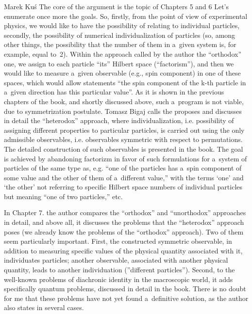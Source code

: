 \begin{newrevengenv}{Marek Kuś}
The core of the argument is the topic of Chapters 5 and 6 Let's enumerate once more the goals. So, firstly, from the point of view of experimental physics, we would like to have the possibility of relating to individual particles, secondly, the possibility of numerical individualization of particles (so, among other things, the possibility that the number of them in a~given system is, for example, equal to~2). Within the approach called by the author the ``orthodox'' one, we assign to each particle ``its'' Hilbert space (``factorism''), and then we would like to measure a~given observable (e.g., spin component) in one of these spaces, which would allow statements ``the spin component of the k-th particle in a~given direction has this particular value''. As it is shown in the previous chapters of the book, and shortly discussed above, such a~program is not viable, due to symmetrization postulate. Tomasz Bigaj calls the proposes and discusses in detail the ``heterodox'' approach, where individualization, i.e. possibility of assigning different properties to particular particles, is carried out using the only admissible observables, i.e. observables symmetric with respect to permutations. The detailed construction of such observables is presented in the book. The goal is achieved by abandoning factorizm in favor of such formulations for a~system of particles of the same type as, e.g. ``one of the particles has a~spin component of some value and the other of them of a~different value,'' with the terms ‘one' and ‘the other' not referring to specific Hilbert space numbers of individual particles but meaning ``one of two particles,'' etc.

In Chapter 7. the author compares the ``orthodox'' and ``unorthodox'' approaches in detail, and above all, it discusses the problems that the ``heterodox'' approach poses (we already know the problems of the ``orthodox'' approach). Two of them seem particularly important. First, the constructed symmetric observable, in addition to measuring specific values of the physical quantity associated with it, individuates particles; another observable, associated with another physical quantity, leads to another individuation (''different particles''). Second, to the well-known problems of diachronic identity in the macroscopic world, it adds specifically quantum problems, discussed in detail in the book. There is no doubt for me that these problems have not yet found a~definitive solution, as the author also states in several cases.


\end{newrevengenv}
